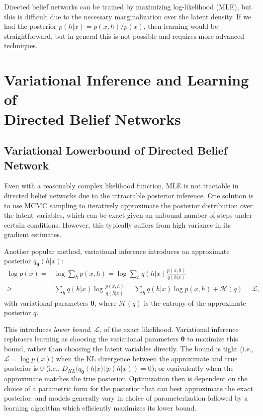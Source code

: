 \documentclass{article} %
\newcommand{\vects}[1]{\boldsymbol{#1}}
\newcommand{\TT}[0]{\vects{\theta}}
\newcommand{\LL}[0]{\mathcal{L}}
\newcommand{\HH}[0]{\mathcal{H}}
\begin{document}
Directed belief networks can be trained by maximizing log-likelihood (MLE), but
this is difficult due to the necessary marginalization over the latent density.
If we had the posterior $p(h|x) = p(x, h) / p(x)$, then learning would be straightforward,
but in general this is not possible and requires more advanced
techniques. 

\section{Variational Inference and Learning of \\ Directed Belief Networks}

\subsection{Variational Lowerbound of Directed Belief Network}

Even with a reasonably complex likelihood function, MLE is not tractable in
directed belief networks due to the intractable posterior inference.  One
solution is to use MCMC sampling to iteratively approximate the posterior
distribution over the latent variables, which can be exact given an unbound number
of steps under certain conditions. However, this typically suffers from high variance in its
gradient estimates.

Another popular method, variational inference introduces an approximate
posterior $q_{\TT}(h|x)$:
\begin{align}
    \label{eq:approx_logp}
    \log p(x) =& \log \sum_{h} p(x, h) 
    = \log \sum_h q(h|x) \frac{p(x, h)}{q(h|x)} \nonumber \\
    \geq& \sum_h q(h|x) \log \frac{p(x, h)}{q(h|x)} 
    = \sum_h q(h|x) \log p(x,h) + \HH(q) = \LL,
\end{align}
with variational parameters $\TT$, where $\HH(q)$ is the entropy of the
approximate posterior $q$. 

This introduces \emph{lower bound}, $\LL$, of the exact likelihood. Variational
inference rephrases learning as choosing the variational parameters $\TT$ to
maximize this bound, rather than choosing the latent variables directly. The
bound is tight (i.e., $\LL = \log p(x)$) when the KL divergence between the
approximate and true posterior is $0$ (i.e., $D_{KL}(q_{\TT}(h|x)||p(h|x)) =
0$); or equivalently when the approximate matches the true posterior.
Optimization then is dependent on the choice of a parametric form for the
posterior that can best approximate the exact posterior, and models generally
vary in choice of parameterization followed by a learning algorithm which
efficiently maximizes its lower bound.
\end{document}

